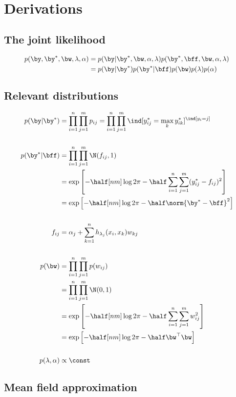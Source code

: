 \section{Derivations}

\subsection{The joint likelihood}

\begin{align*}
  p(\by, \by^*, \bw, \lambda, \alpha)
  &= p(\by | \by^*, \bw, \alpha, \lambda) p(\by^*, \bff, \bw, \alpha, \lambda) \\
  &= p(\by|\by^*) p(\by^* | \bff) p(\bw) p(\lambda) p(\alpha)
\end{align*}

\subsection{Relevant distributions}

\begin{align*}
  p(\by|\by^*) &= \prod_{i=1}^n \prod_{j=1}^m p_{ij} 
  = \prod_{i=1}^n \prod_{j=1}^m \ind[y_{ij}^* = \max_k y_{ik}^*]^{\ind[y_i = j]} \\
  \\
  p(\by^*|\bff) &= \prod_{i=1}^n \prod_{j=1}^m \N(f_{ij},1) \\
  &= \exp \left[-\half[nm]\log 2\pi - \half \sum_{i=1}^n \sum_{j=1}^m (y_{ij}^* - f_{ij})^2 \right] \\
  &= \exp \left[-\half[nm]\log 2\pi - \half \norm{\by^* - \bff}^2 \right] \\
  \\
  f_{ij} &= \alpha_j + \sum_{k=1}^n  h_{\lambda_j}(x_i, x_k)w_{kj} \\
  \\
  p(\bw) &= \prod_{i=1}^n \prod_{j=1}^m p(w_{ij}) \\
  &= \prod_{i=1}^n \prod_{j=1}^m \N(0,1) \\
  &= \exp \left[-\half[nm]\log 2\pi - \half \sum_{i=1}^n \sum_{j=1}^m w_{ij}^2 \right] \\
  &= \exp \left[-\half[nm]\log 2\pi - \half \bw^\top \bw \right] \\
  \\
p(\lambda,\alpha) &\propto \const  
\end{align*}

\subsection{Mean field approximation}

